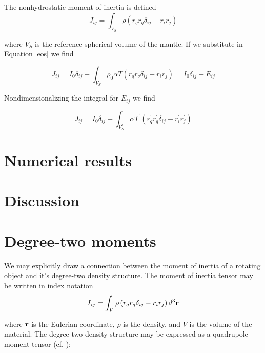 \documentclass[extra]{gji}
\begin{document}
The nonhydrostatic moment of inertia is defined
\begin{equation}
J_{ij} = \int_{V_S} \rho \left( r_q r_q \delta_{ij} - r_i r_j \right) 
\end{equation}

where $V_S$ is the reference spherical volume of the mantle.
If we substitute in Equation \ref{eos} we find

\begin{equation}
J_{ij} = I_0 \delta_{ij} + \int_{V_S} \rho_0 \alpha T \left( r_q r_q \delta_{ij} - r_i r_j \right) = I_0 \delta_{ij} + E_{ij} 
\end{equation}

Nondimensionalizing the integral for $E_{ij}$ we find

\begin{equation}
J_{ij} = I_0 \delta_{ij} + \int_{V_S^\prime} \alpha T^\prime \left( r_q^\prime r_q^\prime \delta_{ij} - r_i^\prime r_j^\prime \right) 
\end{equation}

\section{Numerical results}

\section{Discussion}


\begin{acknowledgments}
\end{acknowledgments}





\appendix

\section{Degree-two moments}

We may explicitly draw a connection between the moment of inertia of a rotating object and it's degree-two density structure.  The moment of inertia tensor may be written in index notation
\begin{equation}
I_{ij} = \int_V \rho \left( r_q r_q \delta_{ij} - r_i r_j \right) d^3 {\bf r}
\label{inertia}
\end{equation}

where $\bf r$ is the Eulerian coordinate, $\rho$ is the density, and $V$ is the volume of the material.  The degree-two density structure may be expressed as a quadrupole-moment tensor (cf. \citet{jackson1998classical}):
\end{document}
